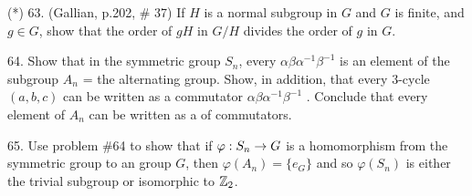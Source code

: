 \documentclass[12pt]{article}
\begin{document}
\begin{description}
\msk

\item{(*) 63.} (Gallian, p.202, \# 37) If $H$ is a normal subgroup in $G$ and $G$ is finite,
and $g\in G$, show that the order of $gH$ in $G/H$ divides the order of $g$ in $G$.

\msk

\item{64.} Show that in the symmetric group $S_n$, every  $\alpha\beta\alpha^{-1}\beta^{-1}$
is an element of the subgroup $A_n$ = the alternating group.
Show, in addition, that
every 3-cycle $(a,b,c)$ can be written as a 
commutator $\alpha\beta\alpha^{-1}\beta^{-1}$ . Conclude that every element of $A_n$
can be written as a  of commutators. 

\msk

\item{65.} Use problem \#64 to show that if $\varphi:S_n\rightarrow G$ is a homomorphism from the 
symmetric group
to an  group $G$, then $\varphi(A_n)=\{e_G\}$ and so $\varphi(S_n)$ is either 
the trivial subgroup or isomorphic
to ${\mathbb Z}_2$.


\end{description}
\vfill
\end{document}
